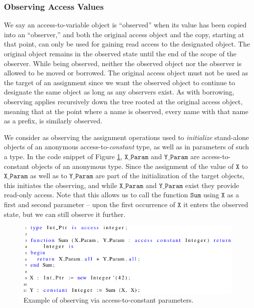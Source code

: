 \documentclass{llncs}
\newcommand\maroua[1]{\textcolor{red}{#1}}
\newcommand\var[1]{\ensuremath{\mathtt{#1}}}
\newcommand{\keyword}[1]{\textsf{#1}}
\begin{document}
\subsubsection{Observing Access Values}
\label{sec:observing}

We say an access-to-variable object is ``observed'' when its value has been copied into an ``observer,'' and both the original
access object and the copy, starting at that point, can only be used for gaining read access to the designated object.
The original object remains in the observed state until the end of the scope of the observer. While being observed, neither the observed object nor the observer is allowed to be moved or
borrowed. The original access object must not be used as the target of an assignment since we want the observed object to continue
to designate the same object as long as any observers exist.  As with borrowing, observing applies recursively down the tree rooted at the original access object, meaning that at the point where a name is observed,
every name with that name as a prefix, is similarly observed.


We consider as observing the assignment operations used to \textit{initialize} stand-alone objects of an anonymous access-to-\textit{constant} type, as well as \keyword{in} parameters of such a type.
In the code snippet of Figure \ref{fig:observe_exp}, \var{X\_Param} and \var{Y\_Param} are access-to-constant objects of an anonymous type. Since the assignment of the value of \var{X} to \var{X\_Param}
as well as to \var{Y\_Param} are part of the initialization of the target objects, this initiates the observing, and while \var{X\_Param} and \var{Y\_Param} exist they provide read-only access. Note that
this allows us to call the function \var{Sum} using \var{X} as a first and second parameter -- upon the first occurrence of \var{X} it enters the observed state, but we can still observe it further.

\begin{figure}[htb!]
\centering
   \includegraphics[]{observe_ex1}
   \caption{Example of observing via access-to-constant parameters.}
   \label{fig:observe_exp}
\end{figure}
\end{document}
